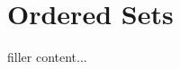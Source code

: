 \documentclass[../../templates/section]{subfiles}
\begin{document}
\section{Ordered Sets}\label{sec:ordered-sets}

filler content...
\end{document}

